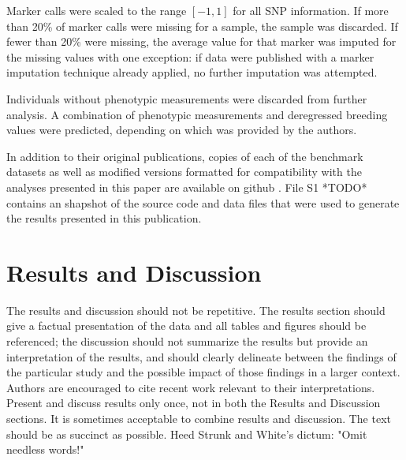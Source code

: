 \documentclass[9pt,twocolumn,twoside]{g3_article/gsag3jnl}
\begin{document}
Marker calls were scaled to the range $[-1, 1]$ for all SNP information. If more than 20\% of
marker calls were missing for a sample, the sample was discarded. If fewer than 20\% were missing,
the average value for that marker was imputed for the missing values with one exception: if data were 
published with a marker imputation technique already applied, no further imputation was attempted.

Individuals without phenotypic measurements were discarded from further analysis. A combination of phenotypic 
measurements and deregressed breeding values were predicted, depending on which was provided by the authors.

In addition to their original publications, copies of each of the benchmark datasets as well 
as modified versions formatted for compatibility with the analyses presented in 
this paper are available on github \citep{mcdowell2016}. File S1 *TODO* contains an shapshot of the 
source code and data files that were used to generate the results presented in this publication.

%

\section*{Results and Discussion}

The results and discussion should not be repetitive. The results section should give a factual 
presentation of the data and all tables and figures should be referenced; the discussion 
should not summarize the results but provide an interpretation of the results, and should 
clearly delineate between the findings of the particular study and the possible impact 
of those findings in a larger context. Authors are encouraged to cite recent work 
relevant to their interpretations. Present and discuss results only once, not in 
both the Results and Discussion sections. It is sometimes acceptable to combine 
results and discussion. The text should be as succinct as possible. 
Heed Strunk and White's dictum: "Omit needless words!"
\end{document}
